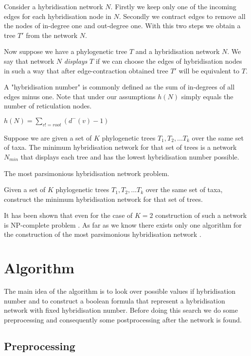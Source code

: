 \documentclass[runningheads, envcountsame, a4paper]{llncs}
\begin{document}
Consider a hybridisation network $N$. Firstly we keep only one of the incoming edges for each hybridisation node in $N$. Secondly we contract edges to remove all the nodes of in-degree one and out-degree one. With this two steps we obtain a tree $T'$ from the network $N$.

Now suppose we have a phylogenetic tree $T$ and a hybridisation network $N$. We say that network $N$ \emph{displays} $T$ if we can choose the edges of hybridisation nodes in such a way that after edge-contraction obtained tree $T'$ will be equivalent to $T$.

A "hybridisation number" is commonly defined as the sum of in-degrees of all edges minus one. Note that under our assumptions $h(N)$ simply equals the number of reticulation nodes.

$h(N) = \sum\limits_{v != root} (d^-(v) - 1)$

Suppose we are given a set of $K$ phylogenetic trees $T_1, T_2, ... T_k$ over the same set of taxa. The minimum hybridisation network for that set of trees is a network $N_{min}$ that displays each tree and has the lowest hybridisation number possible.

The most parsimonious hybridisation network problem.

Given a set of $K$ phylogenetic trees $T_1, T_2, ... T_k$ over the same set of taxa, construct the minimum hybridisation network for that set of trees.

It has been shown that even for the case of $K=2$ construction of such a network is NP-complete problem \cite {M. Bordewich and C. Semple. Computing the minimum number of hybridization events for a consistent evolutionary history.}. As far as we know there exists only one algorithm for the construction of the most parsimonious hybridisation network \cite {wu}.


\section{Algorithm}

The main idea of the algorithm is to look over possible values if hybridisation number and to construct a boolean formula that represent a hybridisation network with fixed hybridisation number. Before doing this search we do some preprocessing and consequently some postprocessing after the network is found.


\subsection{Preprocessing}
\end{document}
